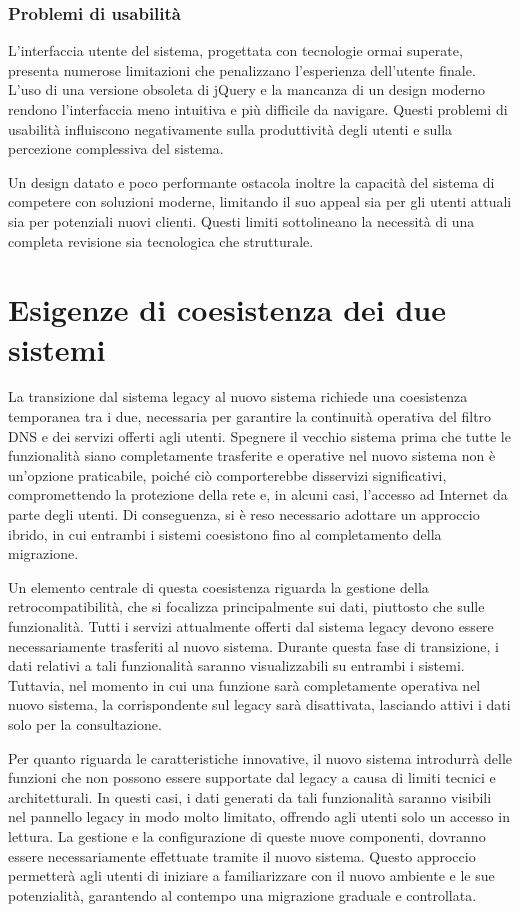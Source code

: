 \subsubsection{Problemi di usabilità}
L'interfaccia utente del sistema, progettata con tecnologie ormai superate, presenta numerose limitazioni che penalizzano l’esperienza dell’utente finale. L’uso di una versione obsoleta di jQuery e la mancanza di un design moderno rendono l’interfaccia meno intuitiva e più difficile da navigare. Questi problemi di usabilità influiscono negativamente sulla produttività degli utenti e sulla percezione complessiva del sistema.

Un design datato e poco performante ostacola inoltre la capacità del sistema di competere con soluzioni moderne, limitando il suo appeal sia per gli utenti attuali sia per potenziali nuovi clienti. Questi limiti sottolineano la necessità di una completa revisione sia tecnologica che strutturale.

\section{Esigenze di coesistenza dei due sistemi}
La transizione dal sistema legacy al nuovo sistema richiede una coesistenza temporanea tra i due, necessaria per garantire la continuità operativa del filtro DNS e dei servizi offerti agli utenti. Spegnere il vecchio sistema prima che tutte le funzionalità siano completamente trasferite e operative nel nuovo sistema non è un’opzione praticabile, poiché ciò comporterebbe disservizi significativi, compromettendo la protezione della rete e, in alcuni casi, l'accesso ad Internet da parte degli utenti. Di conseguenza, si è reso necessario adottare un approccio ibrido, in cui entrambi i sistemi coesistono fino al completamento della migrazione.

Un elemento centrale di questa coesistenza riguarda la gestione della retrocompatibilità, che si focalizza principalmente sui dati, piuttosto che sulle funzionalità. Tutti i servizi attualmente offerti dal sistema legacy devono essere necessariamente trasferiti al nuovo sistema. Durante questa fase di transizione, i dati relativi a tali funzionalità saranno visualizzabili su entrambi i sistemi. Tuttavia, nel momento in cui una funzione sarà completamente operativa nel nuovo sistema, la corrispondente sul legacy sarà disattivata, lasciando attivi i dati solo per la consultazione.

Per quanto riguarda le caratteristiche innovative, il nuovo sistema introdurrà delle funzioni che non possono essere supportate dal legacy a causa di limiti tecnici e architetturali. In questi casi, i dati generati da tali funzionalità saranno visibili nel pannello legacy in modo molto limitato, offrendo agli utenti solo un accesso in lettura. La gestione e la configurazione di queste nuove componenti, dovranno essere necessariamente effettuate tramite il nuovo sistema. Questo approccio permetterà agli utenti di iniziare a familiarizzare con il nuovo ambiente e le sue potenzialità, garantendo al contempo una migrazione graduale e controllata.

